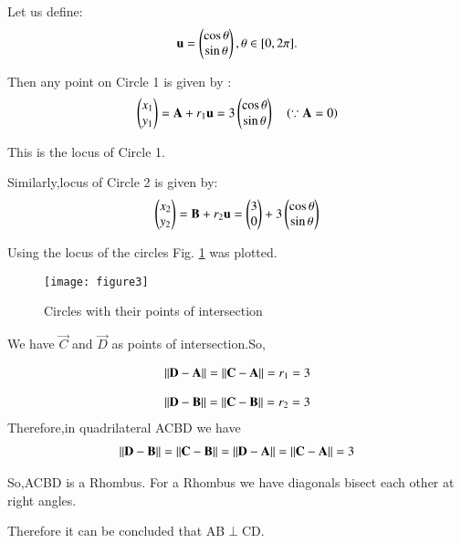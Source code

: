 \documentclass[journal,12pt,twocolumn]{IEEEtran}
\begin{document}
Let us define:
\begin{align}
\mathbf{u}=\begin{pmatrix}\cos \theta\\  \sin \theta\end{pmatrix},  \theta \in [0,2\pi].
\end{align}

Then any point  on Circle 1 is given by :
\begin{align}
\begin{pmatrix}x_{1}\\y_{1}\end{pmatrix}=\mathbf{A}+r_{1}\mathbf{u}=3\begin{pmatrix}\cos \theta\\ \sin \theta\end{pmatrix}\quad \left(\because \mathbf{A}=0\right)
\end{align}

 This is the locus of Circle 1.

Similarly,locus of Circle 2 is given by:
\begin{align}
\begin{pmatrix}x_{2}\\y_{2}\end{pmatrix}=\mathbf{B}+r_{2}\mathbf{u}=\begin{pmatrix}3\\0\end{pmatrix}+3\begin{pmatrix}\cos\theta\\  \sin \theta\end{pmatrix}
\end{align}

Using the locus of the circles Fig. \ref{fig:circle} was plotted.

\begin{figure}[H]
\centering
\texttt{[image: figure3]}
\caption{Circles with their points of intersection}
\label{fig:circle}	
\end{figure}

We have $\vec{C}$ and $\vec{D}$ as points of intersection.So,

\begin{align}
\lVert\mathbf{D}-\mathbf{A}\rVert = \lVert\mathbf{C}-\mathbf{A}\rVert=r_{1}=3
\end{align}

\begin{align}
\lVert\mathbf{D}-\mathbf{B}\rVert = \lVert\mathbf{C}-\mathbf{B}\rVert=r_{2}=3
\end{align}
Therefore,in quadrilateral ACBD we have
\begin{align}
\lVert\mathbf{D}-\mathbf{B}\rVert = \lVert\mathbf{C}-\mathbf{B}\rVert=\lVert\mathbf{D}-\mathbf{A}\rVert = \lVert\mathbf{C}-\mathbf{A}\rVert=3 \label{eq:0}
\end{align}

So,ACBD is a Rhombus.
For a Rhombus we have diagonals bisect each other at right angles.

Therefore it can be concluded that AB$\perp$CD.
\end{document}

